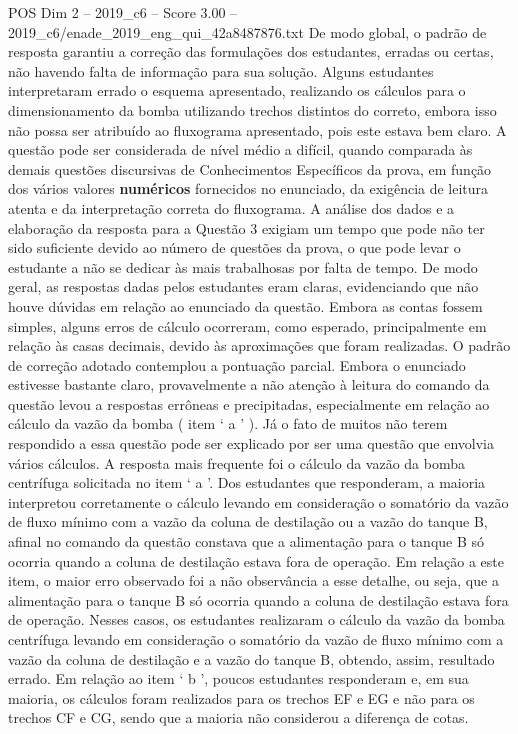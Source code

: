 \begin{textsample}{POS Dim 2 – 2019\_c6 – Score 3.00 – 2019\_c6/enade\_2019\_eng\_qui\_42a8487876.txt}
De modo global, o padrão de resposta garantiu a correção das formulações dos estudantes, erradas ou certas, não havendo falta de informação para sua solução.
Alguns estudantes interpretaram errado o esquema apresentado, realizando os cálculos para o dimensionamento da bomba utilizando trechos distintos do correto, embora isso não possa ser atribuído ao fluxograma apresentado, pois este estava bem claro.
A questão pode ser considerada de nível médio a difícil, quando comparada às demais questões discursivas de Conhecimentos Específicos da prova, em função dos vários valores \textbf{numéricos} fornecidos no enunciado, da exigência de leitura atenta e da interpretação correta do fluxograma.
A análise dos dados e a elaboração da resposta para a Questão 3 exigiam um tempo que pode não ter sido suficiente devido ao número de questões da prova, o que pode levar o estudante a não se dedicar às mais trabalhosas por falta de tempo.
De modo geral, as respostas dadas pelos estudantes eram claras, evidenciando que não houve dúvidas em relação ao enunciado da questão.
Embora as contas fossem simples, alguns erros de cálculo ocorreram, como esperado, principalmente em relação às casas decimais, devido às aproximações que foram realizadas.
O padrão de correção adotado contemplou a pontuação parcial.
Embora o enunciado estivesse bastante claro, provavelmente a não atenção à leitura do comando da questão levou a respostas errôneas e precipitadas, especialmente em relação ao cálculo da vazão da bomba ( item ‘ a ’ ).
Já o fato de muitos não terem respondido a essa questão pode ser explicado por ser uma questão que envolvia vários cálculos.
A resposta mais frequente foi o cálculo da vazão da bomba centrífuga solicitada no item ‘ a ’.
Dos estudantes que responderam, a maioria interpretou corretamente o cálculo levando em consideração o somatório da vazão de fluxo mínimo com a vazão da coluna de destilação ou a vazão do tanque B, afinal no comando da questão constava que a alimentação para o tanque B só ocorria quando a coluna de destilação estava fora de operação.
Em relação a este item, o maior erro observado foi a não observância a esse detalhe, ou seja, que a alimentação para o tanque B só ocorria quando a coluna de destilação estava fora de operação.
Nesses casos, os estudantes realizaram o cálculo da vazão da bomba centrífuga levando em consideração o somatório da vazão de fluxo mínimo com a vazão da coluna de destilação e a vazão do tanque B, obtendo, assim, resultado errado.
Em relação ao item ‘ b ’, poucos estudantes responderam e, em sua maioria, os cálculos foram realizados para os trechos EF e EG e não para os trechos CF e CG, sendo que a maioria não considerou a diferença de cotas.

\end{textsample}
